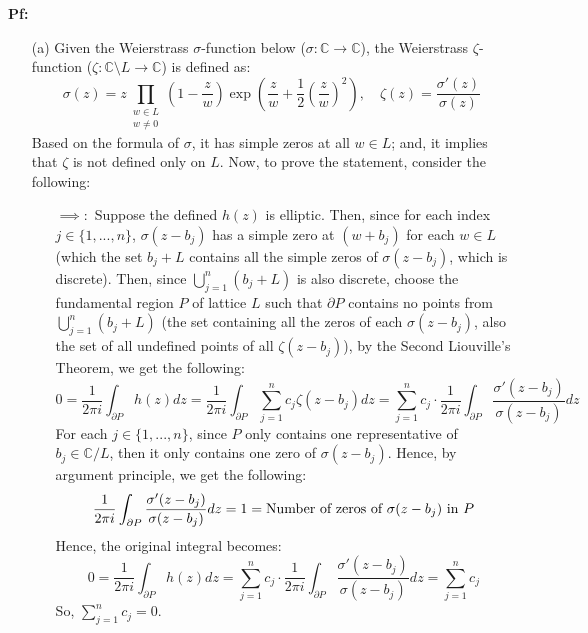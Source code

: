 \documentclass{article}
\begin{document}
\textbf{Pf:}
\begin{itemize}
    \item[(a)] Given the Weierstrass $\sigma$-function below ($\sigma:\mathbb{C}\rightarrow\mathbb{C}$), the Weierstrass $\zeta$-function ($\zeta:\mathbb{C}\setminus L\rightarrow\mathbb{C}$) is defined as:
    $$\sigma(z)=z\prod_{\substack{w\in L\\w\neq 0}}\left(1-\frac{z}{w}\right)\exp\left(\frac{z}{w}+\frac{1}{2}\left(\frac{z}{w}\right)^2\right),\quad \zeta(z)=\frac{\sigma'(z)}{\sigma(z)}$$
    Based on the formula of $\sigma$, it has simple zeros at all $w\in L$; and, it implies that $\zeta$ is not defined only on $L$. Now, to prove the statement, consider the following:
    \begin{itemize}
        \item[$\implies:$] Suppose the defined $h(z)$ is elliptic. Then, since for each index $j\in\{1,...,n\}$, $\sigma(z-b_j)$ has a simple zero at $(w+b_j)$ for each $w\in L$ (which the set $b_j+L$ contains all the simple zeros of $\sigma(z-b_j)$, which is discrete). Then, since $\bigcup_{j=1}^{n}(b_j+L)$ is also discrete, choose the fundamental region $P$ of lattice $L$ such that $\partial P$ contains no points from $\bigcup_{j=1}^{n}(b_j+L)$ (the set containing all the zeros of each $\sigma(z-b_j)$, also the set of all undefined points of all $\zeta(z-b_j)$), by the Second Liouville's Theorem, we get the following:
        $$0=\frac{1}{2\pi i}\int_{\partial P}h(z)dz = \frac{1}{2\pi i}\int_{\partial P}\sum_{j=1}^{n}c_j\zeta(z-b_j)dz = \sum_{j=1}^{n}c_j\cdot\frac{1}{2\pi i}\int_{\partial P}\frac{\sigma'(z-b_j)}{\sigma(z-b_j)}dz$$
        For each $j\in\{1,...,n\}$, since $P$ only contains one representative of $b_j\in\mathbb{C}/L$, then it only contains one zero of $\sigma(z-b_j)$. Hence, by argument principle, we get the following:
        $$\frac{1}{2\pi i}\int_{\partial P}\frac{\sigma'(z-b_j)}{\sigma(z-b_j)}dz = 1 = \textmd{Number of zeros of } \sigma(z-b_j) \textmd{ in } P$$
        Hence, the original integral becomes:
        $$0=\frac{1}{2\pi i}\int_{\partial P}h(z)dz = \sum_{j=1}^{n}c_j\cdot\frac{1}{2\pi i}\int_{\partial P}\frac{\sigma'(z-b_j)}{\sigma(z-b_j)}dz = \sum_{j=1}^{n}c_j$$
        So, $\sum_{j=1}^{n}c_j = 0$.

        \hfil


\end{itemize}
\end{itemize}
\end{document}
